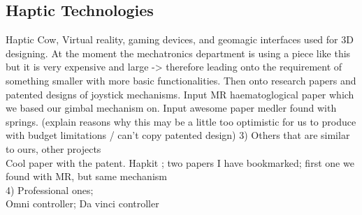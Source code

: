 
\subsection{Haptic Technologies}
\label{sub:market_research}
Haptic Cow, Virtual reality, gaming devices,  and geomagic interfaces used for 3D designing. At the moment the mechatronics department is using a piece like this but it is very expensive and large -> therefore leading onto the requirement of something smaller with more basic functionalities.
Then onto research papers and patented designs of joystick mechanisms.
Input MR haematoglogical paper which we based our gimbal mechanism on.
Input awesome paper medler found with springs. (explain reasons why this may be a little too optimistic for us to produce with budget limitations / can’t copy patented design)
3) Others that are similar to ours, other projects\\
    Cool paper with the patent. Hapkit ; two papers I have bookmarked; first one we found with MR, but same mechanism\\
4) Professional ones;\\
    Omni controller; Da vinci controller\\


